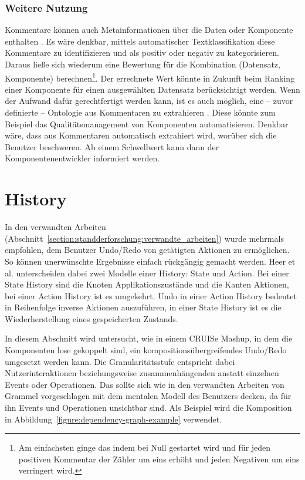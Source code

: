 \documentclass[
	headsepline,
	footsepline,
	fontsize=12pt,
	bibliography=totoc
]{scrbook}
\begin{document}
\subsubsection{Weitere Nutzung}


Kommentare können auch Metainformationen über die Daten oder Komponente enthalten \cite{Chen2009}. Es wäre denkbar, mittels automatischer Textklassifikation \cite{Sebastiani2002} diese Kommentare zu identifizieren und als positiv oder negativ zu kategorisieren. Daraus ließe sich wiederum eine Bewertung für die Kombination (Datensatz, Komponente) berechnen\footnote{Am einfachsten ginge das indem bei Null gestartet wird und für jeden positiven Kommentar der Zähler um eins erhöht und jeden Negativen um eins verringert wird.}. Der errechnete Wert könnte in Zukunft beim Ranking einer Komponente für einen ausgewählten Datensatz berücksichtigt werden. Wenn der Aufwand dafür gerechtfertigt werden kann, ist es auch möglich, eine -- zuvor definierte -- Ontologie aus Kommentaren zu extrahieren \cite{Alani2003}. Diese könnte zum Beispiel das Qualitätsmanagement von Komponenten automatisieren. Denkbar wäre, dass aus Kommentaren automatisch extrahiert wird, worüber sich die Benutzer beschweren. Ab einem Schwellwert kann dann der Komponentenentwickler informiert werden.

\section{History}
\label{section:konzeption:history}


In den verwandten Arbeiten (Abschnitt~\ref{section:standderforschung:verwandte_arbeiten}) wurde mehrmals empfohlen, dem Benutzer Undo/Redo von getätigten Aktionen zu ermöglichen. So können unerwünschte Ergebnisse einfach rückgängig gemacht werden. Heer et al. \cite{Heer2008} unterscheiden dabei zwei Modelle einer History: State und Action. Bei einer State History sind die Knoten Applikationszustände und die Kanten Aktionen, bei einer Action History ist es umgekehrt. Undo in einer Action History bedeutet in Reihenfolge inverse Aktionen auszuführen, in einer State History ist es die Wiederherstellung eines gespeicherten Zustands.

In diesem Abschnitt wird untersucht, wie in einem CRUISe Mashup, in dem die Komponenten lose gekoppelt sind, ein kompositionsübergreifendes Undo/Redo umgesetzt werden kann. Die Granularitätsstufe entspricht dabei Nutzerinteraktionen beziehungsweise zusammenhängenden anstatt einzelnen Events oder Operationen. Das sollte sich wie in den verwandten Arbeiten von Grammel \cite{Grammel2012} vorgeschlagen mit dem mentalen Modell des Benutzers decken, da für ihn Events und Operationen unsichtbar sind. Als Beispiel wird die Komposition in Abbildung~\ref{figure:dependency-graph-example} verwendet.
\end{document}
